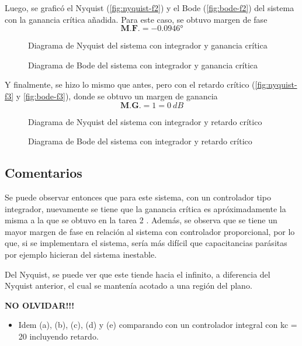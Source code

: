 Luego, se graficó el Nyquist (\autoref{fig:nyquist-f2}) y el Bode (\autoref{fig:bode-f2})
del sistema con la ganancia crítica añadida. Para este caso, se obtuvo margen de fase
\begin{equation}
  \boxed{\textbf{M.F.} = \ang{-0.0946}}
\end{equation}

\begin{figure}[h]
  \centering
  
  \caption{Diagrama de Nyquist del sistema con integrador y ganancia crítica}
  \label{fig:nyquist-f2}
\end{figure}

\begin{figure}[h]
  \centering
  
  \caption{Diagrama de Bode del sistema con integrador y ganancia crítica}
  \label{fig:bode-f2}
\end{figure}

Y finalmente, se hizo lo mismo que antes, pero con el retardo crítico (\autoref{fig:nyquist-f3}
y \autoref{fig:bode-f3}), donde se obtuvo un margen de ganancia
\begin{equation}
  \boxed{\textbf{M.G.} = 1 = 0\ \unit{dB}}
\end{equation}

\begin{figure}[h]
  \centering
  
  \caption{Diagrama de Nyquist del sistema con integrador y retardo crítico}
  \label{fig:nyquist-f3}
\end{figure}

\begin{figure}[h]
  \centering
  
  \caption{Diagrama de Bode del sistema con integrador y retardo crítico}
  \label{fig:bode-f3}
\end{figure}

\FloatBarrier
\subsection{Comentarios}

Se puede observar entonces que para este sistema, con un controlador tipo integrador,
nuevamente se tiene que la ganancia crítica es apróximadamente la misma a la que se
obtuvo en la tarea 2 \cite{tarea-2-sdc}. Además, se observa que se tiene un mayor
margen de fase en relación al sistema con controlador proporcional, por lo que, si
se implementara el sistema, sería más difícil que capacitancias parásitas por ejemplo
hicieran del sistema inestable.

Del Nyquist, se puede ver que este tiende hacia el infinito, a diferencia del Nyquist
anterior, el cual se mantenía acotado a una región del plano.

\textbf{NO OLVIDAR!!!}

\begin{itemize}
  \item Idem (a), (b), (c), (d) y (e) comparando con un controlador integral con kc = 20 incluyendo retardo.
\end{itemize}
